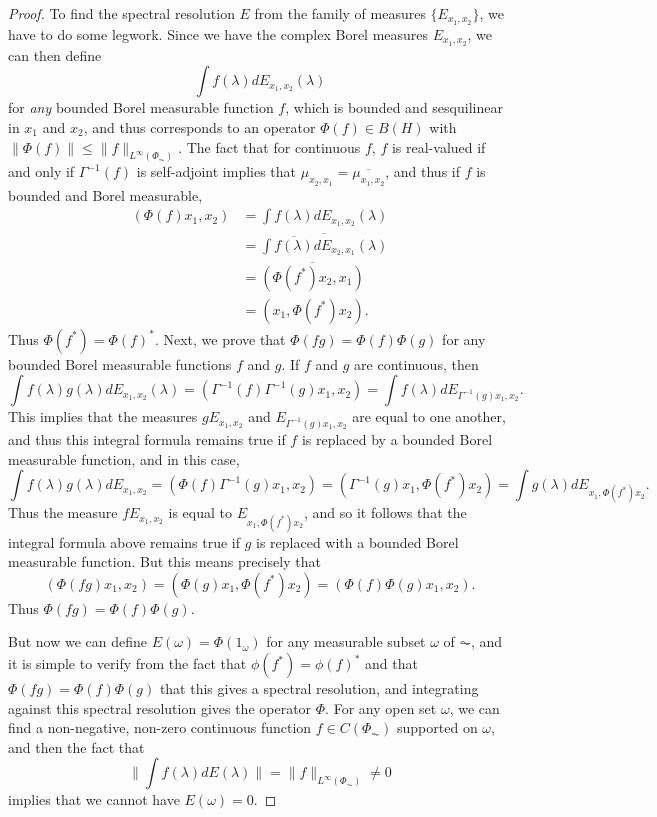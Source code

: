 \begin{proof}
    To find the spectral resolution $E$ from the family of measures $\{ E_{x_1,x_2} \}$, we have to do some legwork. Since we have the complex Borel measures $E_{x_1,x_2}$, we can then define
    \[ \int f(\lambda) dE_{x_1,x_2}(\lambda) \]
    for \emph{any} bounded Borel measurable function $f$, which is bounded and sesquilinear in $x_1$ and $x_2$, and thus corresponds to an operator $\Phi(f) \in B(H)$ with $\| \Phi(f) \| \leq \| f \|_{L^\infty(\Phi_{\AC})}$. The fact that for continuous $f$, $f$ is real-valued if and only if $\Gamma^{-1}(f)$ is self-adjoint implies that $\mu_{x_2,x_1} = \overline{\mu_{x_1,x_2}}$, and thus if $f$ is bounded and Borel measurable,
    \begin{align*}
        (\Phi(f) x_1, x_2) &= \int f(\lambda) dE_{x_1,x_2}(\lambda)\\
        &= \overline{ \int \overline{f(\lambda)} dE_{x_2,x_1}(\lambda) }\\
        &= \overline{ (\Phi(f^*) x_2, x_1) }\\
        &= (x_1, \Phi(f^*) x_2).
    \end{align*}
    Thus $\Phi(f^*) = \Phi(f)^*$. Next, we prove that $\Phi(fg) = \Phi(f)\Phi(g)$ for any bounded Borel measurable functions $f$ and $g$. If $f$ and $g$ are continuous, then
    \[ \int f(\lambda) g(\lambda) dE_{x_1,x_2}(\lambda) = (\Gamma^{-1}(f) \Gamma^{-1}(g) x_1, x_2) = \int f(\lambda) dE_{\Gamma^{-1}(g) x_1, x_2}. \]
    This implies that the measures $g E_{x_1,x_2}$ and $E_{\Gamma^{-1}(g) x_1,x_2}$ are equal to one another, and thus this integral formula remains true if $f$ is replaced by a bounded Borel measurable function, and in this case,
    \[ \int f(\lambda) g(\lambda) dE_{x_1,x_2} = (\Phi(f) \Gamma^{-1}(g) x_1, x_2) = (\Gamma^{-1}(g) x_1, \Phi(f^*) x_2) = \int g(\lambda) dE_{x_1, \Phi(f^*) x_2}. \]
    Thus the measure $f E_{x_1,x_2}$ is equal to $E_{x_1, \Phi(f^*) x_2}$, and so it follows that the integral formula above remains true if $g$ is replaced with a bounded Borel measurable function. But this means precisely that
    \[ (\Phi(fg) x_1, x_2) = (\Phi(g) x_1, \Phi(f^*) x_2) = (\Phi(f) \Phi(g) x_1, x_2). \]
    Thus $\Phi(fg) = \Phi(f) \Phi(g)$.

    But now we can define $E(\omega) = \Phi(1_\omega)$ for any measurable subset $\omega$ of $\AC$, and it is simple to verify from the fact that $\phi(f^*) = \phi(f)^*$ and that $\Phi(fg) = \Phi(f) \Phi(g)$ that this gives a spectral resolution, and integrating against this spectral resolution gives the operator $\Phi$. For any open set $\omega$, we can find a non-negative, non-zero continuous function $f \in C(\Phi_{\AC})$ supported on $\omega$, and then the fact that
    \[ \| \int f(\lambda) dE(\lambda) \| = \| f \|_{L^\infty(\Phi_{\AC})} \neq 0 \]
    implies that we cannot have $E(\omega) = 0$.
\end{proof}

